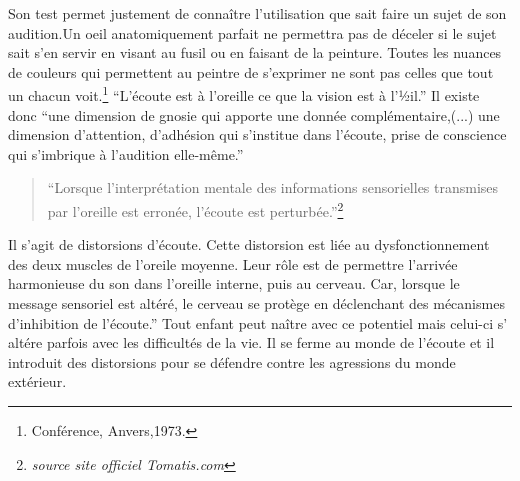 Son test permet justement de connaître l'utilisation que sait faire
un sujet de son audition.Un oeil anatomiquement parfait ne permettra
pas de déceler si le sujet sait s'en servir en visant au fusil ou
en faisant de la peinture. Toutes les nuances de couleurs qui permettent
au peintre de s'exprimer ne sont pas celles que tout un chacun voit.\footnote{Conférence, Anvers,1973.}
``L'écoute est à l\textquoteright oreille ce que la vision est à
l'½il.'' Il existe donc ``une dimension de gnosie qui apporte une
donnée complémentaire,(...) une dimension d'attention, d\textquoteright adhésion
qui s'institue dans l'écoute, prise de conscience qui s\textquoteright imbrique
à l'audition elle-même.'' 
\begin{quotation}
``Lorsque l'interprétation mentale des informations sensorielles
transmises par l'oreille est erronée, l'écoute est perturbée.''\footnote{\emph{source site officiel Tomatis.com}}
\end{quotation}
Il s'agit de distorsions d'écoute. Cette distorsion est liée au dysfonctionnement
des deux muscles de l'oreile moyenne. Leur rôle est de permettre l'arrivée
harmonieuse du son dans l'oreille interne, puis au cerveau. Car, lorsque
le message sensoriel est altéré, le cerveau se protège en déclenchant
des mécanismes d'inhibition de l'écoute.'' Tout enfant peut naître
avec ce potentiel mais celui-ci s' altére parfois avec les difficultés
de la vie. Il se ferme au monde de l'écoute et il introduit des distorsions
pour se défendre contre les agressions du monde extérieur. 

